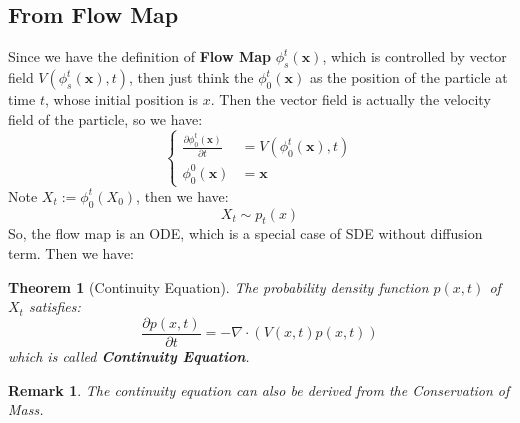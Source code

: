 \documentclass{article}
\newtheorem{theorem}{Theorem}
\newtheorem{remark}{Remark}
\begin{document}
\subsection{From Flow Map}
Since we have the definition of \textbf{Flow Map} $\phi_s^t(\mathbf{x})$, which is controlled by vector field $V(\phi_s^t(\mathbf{x}), t)$, 
then just think the $\phi_0^t(\mathbf{x})$ as the position of the particle at time $t$, whose initial position is $x$. 
Then the vector field is actually the velocity field of the particle, so we have:
\begin{equation}\left\{
    \begin{aligned}
        \frac{\partial \phi_0^t(\mathbf{x})}{\partial t} &= V(\phi_0^t(\mathbf{x}), t)\\
        \phi_0^0(\mathbf{x}) &= \mathbf{x}
    \end{aligned}\right.
\end{equation}
Note $X_t:=\phi_0^t(X_0)$, then we have:
\begin{equation}
    X_t \sim p_t(x)
\end{equation}
So, the flow map is an ODE, which is a special case of SDE without diffusion term. Then we have:
\begin{theorem}[Continuity Equation]
    The probability density function $p(x, t)$ of $X_t$ satisfies:
    \begin{equation}
        \frac{\partial p(x, t)}{\partial t} = -\nabla\cdot\left(V(x, t)p(x, t)\right)
    \end{equation}
    which is called \textbf{Continuity Equation}.
\end{theorem}
\begin{remark}
    The continuity equation can also be derived from the Conservation of Mass.
\end{remark}
\end{document}

